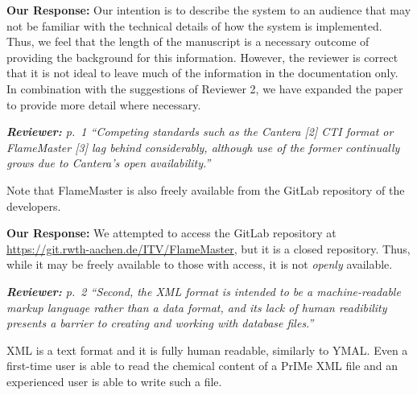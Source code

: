 \documentclass[a4paper,10pt]{elsarticle}
\newenvironment{reviewer}{\vspace{0.5\baselineskip}\begingroup\itshape\textbf{Reviewer:}}{\endgroup\vspace{0.5\baselineskip}}
\newenvironment{response}{\vspace{0.5\baselineskip}\textbf{Our Response:}}{\vspace{0.5\baselineskip}}
\begin{document}
\begin{response}
    Our intention is to describe the system to an audience that may not be familiar with the
    technical details of how the system is implemented. Thus, we feel that the length of the
    manuscript is a necessary outcome of providing the background for this information. However, the
    reviewer is correct that it is not ideal to leave much of the information in the documentation
    only. In combination with the suggestions of Reviewer 2, we have expanded the paper to provide
    more detail where necessary.
\end{response}

\begin{reviewer}
    p.~1 ``Competing standards such as the Cantera [2] CTI format or FlameMaster [3] lag behind
    considerably, although use of the former continually grows due to Cantera's open availability.''

    Note that FlameMaster is also freely available from the GitLab repository of the developers.
\end{reviewer}

\begin{response}
    We attempted to access the GitLab repository at \url{https://git.rwth-aachen.de/ITV/FlameMaster}, but
    it is a closed repository. Thus, while it may be freely available to those with access, it is not
    \emph{openly} available.
\end{response}

\begin{reviewer}
    p.~2 ``Second, the XML format is intended to be a machine-readable markup language rather than a
    data format, and its lack of human readibility presents a barrier to creating and working with
    database files.''

    XML is a text format and it is fully human readable, similarly to YMAL. Even a
    first-time user is able to read the chemical content of a  PrIMe XML file and an experienced
    user is able to write such a file.
\end{reviewer}
\end{document}
